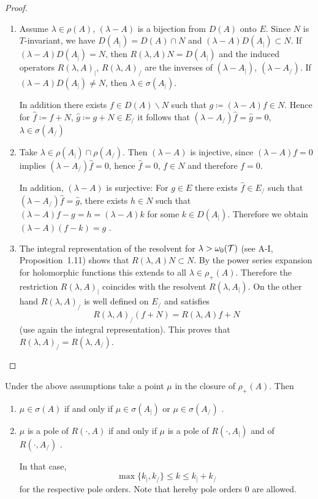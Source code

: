 \begin{proof}
\begin{enumerate}[\upshape (i), wide, labelsep=.5em]
\item 
Assume $\lambda \in \rho(A)$, \ie $(\lambda-A)$ is a bijection from $D(A)$ onto $E$.
Since $N$ is $T$-invariant, we have $D(A_{|}) = D(A) \cap N$ and $(\lambda-A)D(A_{|}) \subset N$.
If $(\lambda-A)D(A_{|}) = N$, then $R(\lambda,A)N = D(A_{|})$ and the induced operators $R(\lambda,A)_{|}$, \resp $R(\lambda,A)_{/}$ are the inverses of $(\lambda-A_{|})$, \resp $(\lambda-A_{/})$.
If $(\lambda-A)D(A_{|}) \neq N$, then $\lambda \in \sigma(A_{|})$.

In addition there exists $f \in D(A)\backslash N$ such that $g \coloneqq (\lambda-A)f \in N$.
Hence for $\hat{f} \coloneqq f+N$, $\hat{g} \coloneqq g+N \in E_{/}$ it follows that $(\lambda-A_{/})\hat{f} = \hat{g} = 0$, \ie $\lambda \in \sigma(A_{/})$

\item 
Take $\lambda \in \rho(A_{|}) \cap \rho(A_{/})$.
Then $(\lambda-A)$ is injective, since $(\lambda-A)f = 0$ implies $(\lambda-A_{/})\hat{f}= 0$, hence $\hat{f} = 0$, \ie $f \in N$ and therefore $f = 0$.

In addition, $(\lambda-A)$ is surjective: For $g \in E$ there exists $\hat{f} \in E_{/}$ such that $(\lambda-A_{/})\hat{f} = \hat{g}$, \ie there exists $h \in N$ such that $(\lambda-A)f - g = h = (\lambda-A)k$ for some $k \in D(A_{|})$.
Therefore we obtain $(\lambda-A)(f-k) = g$ .

\item 
The integral representation of the resolvent for $\lambda > \omega_{0}(\mathcal{T})$ (see A-I, Proposition~1.11) shows that $R(\lambda,A)N \subset N$.
By the power series expansion for holomorphic functions this extends to all $\lambda \in \rho_{+}(A)$.
Therefore the restriction $R(\lambda,A)_{|}$ coincides with the resolvent $R(\lambda,A_{|})$.
On the other hand $R(\lambda,A)_{/}$ is well defined on $E_{/}$ and satisfies
\[
R(\lambda,A)_{/}(f+N) = R(\lambda,A)f + N
\]
(use again the integral representation).
This proves that $R(\lambda,A)_{/} = R(\lambda,A_{/})$.
\end{enumerate}
\end{proof}
\begin{corollary}\label{cor:a3-4.3}
Under the above assumptions take a point $\mu$ in the closure of $\rho_{+}(A)$.
Then
\begin{enumerate}[\upshape (i)]
\item 
$\mu \in \sigma(A)$ if and only if $\mu \in \sigma(A_{|})$ or $\mu \in \sigma(A_{/})$ .

\item 
$\mu$ is a pole of $R(\cdot,A)$ if and only if $\mu$ is a pole of $R(\cdot,A_{|})$ and of $R(\cdot,A_{/})$ .

In that case,
\[
\max\{k_{|},k_{/}\} \leq k \leq k_{|} + k_{/}
\]
for the respective pole orders. Note that hereby pole orders $0$ are allowed.
\end{enumerate}
\end{corollary}

